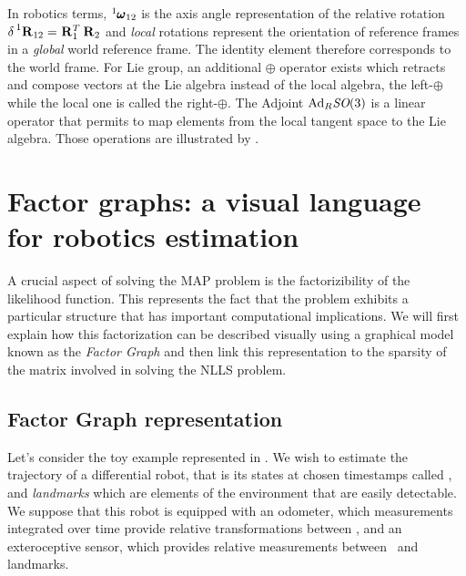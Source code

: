 In robotics terms, $\prescript{1}{}{\pmb{\omega}}_{12}$ is the axis angle representation of the relative rotation $\delta \prescript{1}{}{{\bf R}}_{12} = \prescript{}{}{{\bf R}}_{1}^T\prescript{}{}{{\bf R}}_{2}$ and
\textit{local} rotations represent the orientation of reference frames in a \textit{global} world reference frame. The identity element therefore corresponds 
to the world frame. For Lie group, an additional $\oplus$ operator exists which retracts and compose vectors at the Lie algebra instead of
the local algebra, the left-$\oplus$ while the local one is called the right-$\oplus$. The Adjoint $\text{Ad}_{R}\textit{SO}(3)$ is a linear operator that permits to map
elements from the local tangent space to the Lie algebra. Those operations are illustrated by .


%
%
%
\section{Factor graphs: a visual language for robotics estimation}
A crucial aspect of solving the MAP problem is the factorizibility of the likelihood function. This represents the fact that the problem
exhibits a particular structure that has important computational implications. We will first explain how this factorization can be described 
visually using a graphical model known as the \textit{Factor Graph} and then link this representation to the sparsity of the matrix involved
in solving the NLLS problem.


\subsection{Factor Graph representation}
Let's consider the toy example represented in . 
We wish to estimate the trajectory of a differential robot, that is its states at chosen timestamps called \textit{\keyframes}, and \textit{landmarks} which are elements of the 
environment that are easily detectable. We suppose that this robot is equipped with an odometer, which measurements integrated over time provide relative 
transformations between \keyframes, and an exteroceptive sensor, which provides relative measurements between \keyframes~and landmarks.


